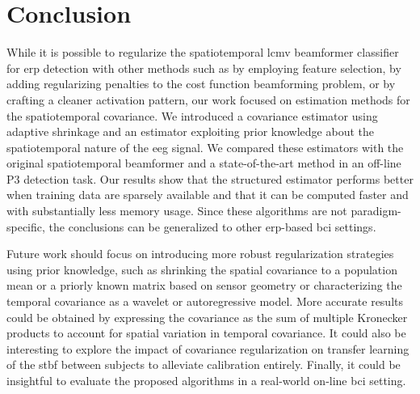	\section{Conclusion}
	While it is possible to regularize the spatiotemporal \ac{lcmv} beamformer
	classifier for \ac{erp} detection with other methods such as by employing feature selection,
	by adding regularizing penalties to the cost
	function beamforming problem, or by crafting a cleaner activation pattern, our work focused on
	estimation methods for the spatiotemporal covariance.
	We introduced a covariance estimator using adaptive shrinkage and an
	estimator exploiting prior knowledge about the spatiotemporal nature of the \ac{eeg}
	signal.
	We compared these estimators with the original spatiotemporal
	beamformer and a state-of-the-art method in an off-line P3 detection task.
	Our results show that the structured estimator performs better when training data are sparsely available and that it can be computed faster and with substantially less memory usage.
	Since these algorithms are not paradigm-specific,  the conclusions can be generalized to
	other \ac{erp}-based \ac{bci} settings.

	Future work should focus on introducing more robust regularization strategies using prior knowledge, such as shrinking the spatial covariance to a population mean or a priorly known matrix based on sensor geometry or characterizing the temporal covariance as a wavelet or autoregressive model.
	More accurate results could be obtained by expressing the covariance as the sum of multiple Kronecker products to account for spatial variation in temporal
	covariance.
	It could also be interesting to explore the impact of covariance regularization on transfer learning of the \ac{stbf} between subjects to alleviate calibration entirely.
	Finally, it could be insightful to evaluate the proposed algorithms in a
	real-world on-line \ac{bci} setting.


